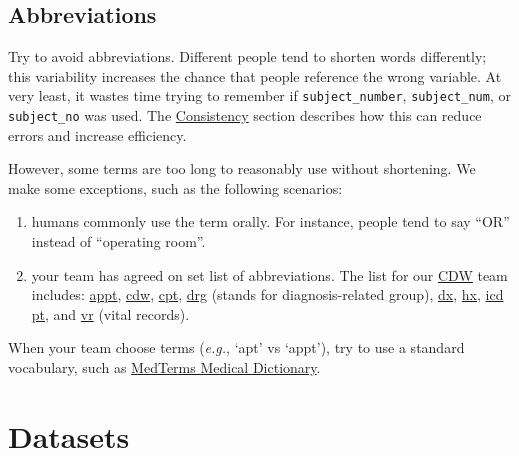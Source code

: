 \documentclass[
]{book}
\begin{document}
\hypertarget{style-abbreviation}{%
\subsection{Abbreviations}\label{style-abbreviation}}

Try to avoid abbreviations. Different people tend to shorten words differently; this variability increases the chance that people reference the wrong variable. At very least, it wastes time trying to remember if \texttt{subject\_number}, \texttt{subject\_num}, or \texttt{subject\_no} was used. The \protect\hyperlink{architecture-consistency}{Consistency} section describes how this can reduce errors and increase efficiency.

However, some terms are too long to reasonably use without shortening. We make some exceptions, such as the following scenarios:

\begin{enumerate}
\def\labelenumi{\arabic{enumi}.}
\item
  humans commonly use the term orally. For instance, people tend to say ``OR'' instead of ``operating room''.
\item
  your team has agreed on set list of abbreviations. The list for our \href{https://github.com/OuhscBbmc/prairie-outpost-public\#readme}{CDW} team includes:
  \href{https://www.merriam-webster.com/dictionary/appointment}{appt},
  \href{https://en.wikipedia.org/wiki/Clinical_data_repository}{cdw},
  \href{https://en.wikipedia.org/wiki/Current_Procedural_Terminology}{cpt},
  \href{https://en.wikipedia.org/wiki/Diagnosis-related_group}{drg} (stands for diagnosis-related group),
  \href{https://www.medicinenet.com/script/main/art.asp?articlekey=33829}{dx},
  \href{https://medical-dictionary.thefreedictionary.com/Hx}{hx},
  \href{https://www.cdc.gov/nchs/icd/icd10cm.htm}{icd}
  \href{https://www.medicinenet.com/script/main/art.asp?articlekey=39154}{pt}, and
  \href{}{vr} (vital records).
\end{enumerate}

When your team choose terms (\emph{e.g.}, `apt' vs `appt'), try to use a standard vocabulary, such as \href{https://www.medicinenet.com/medterms-medical-dictionary/article.htm}{MedTerms Medical Dictionary}.

\hypertarget{datasets}{%
\section{Datasets}\label{datasets}}
\end{document}

